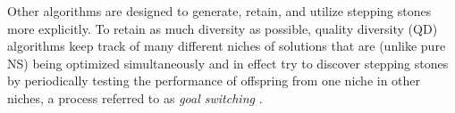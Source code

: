 \documentclass{article}
\newcommand{\jc}[1]{\comments{\textcolor{deepForestGreen}{[JC: #1]}}}
\newcommand{\ks}[1]{\comments{\textcolor{purple}{[Ken: #1]}}}
\newcommand{\rw}[1]{\comments{\textcolor{blue}{[Rui: #1]}}}
\newcommand{\comments}[1]{#1}
\begin{document}
Other algorithms are designed to generate, retain, and utilize stepping stones more explicitly. To retain as much diversity as possible, quality diversity (QD) algorithms
\cite{lehman:gecco11,cully:nature15, mouret2015illuminating,pugh:frontiers16} 
keep track of many different niches of solutions that are (unlike pure NS) being optimized 
simultaneously 
and in effect try to discover stepping stones by periodically testing the performance of offspring from one niche
in other niches, a process referred to 
as \emph{goal switching} \cite{nguyen2016innovative}.
\end{document}
